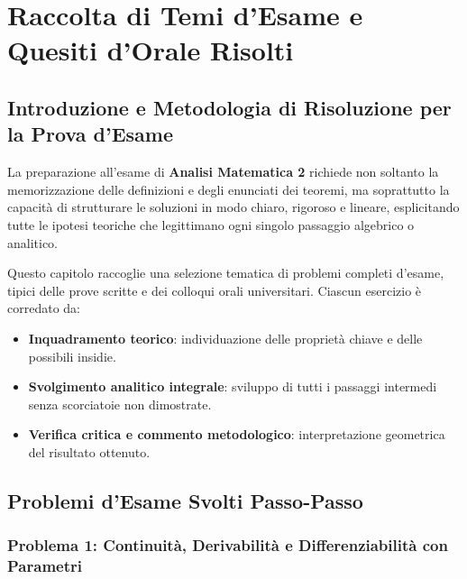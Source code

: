 
\chapter{Raccolta di Temi d'Esame e Quesiti d'Orale Risolti}
\label{chap:raccolta_esami_risolti}

\section{Introduzione e Metodologia di Risoluzione per la Prova d'Esame}

La preparazione all'esame di \textbf{Analisi Matematica 2} richiede non soltanto la memorizzazione delle definizioni e degli enunciati dei teoremi, ma soprattutto la capacità di strutturare le soluzioni in modo chiaro, rigoroso e lineare, esplicitando tutte le ipotesi teoriche che legittimano ogni singolo passaggio algebrico o analitico.

Questo capitolo raccoglie una selezione tematica di problemi completi d'esame, tipici delle prove scritte e dei colloqui orali universitari. Ciascun esercizio è corredato da:
\begin{itemize}
    \item \textbf{Inquadramento teorico}: individuazione delle proprietà chiave e delle possibili insidie.
    \item \textbf{Svolgimento analitico integrale}: sviluppo di tutti i passaggi intermedi senza scorciatoie non dimostrate.
    \item \textbf{Verifica critica e commento metodologico}: interpretazione geometrica del risultato ottenuto.
\end{itemize}

\section{Problemi d'Esame Svolti Passo-Passo}

\subsection{Problema 1: Continuità, Derivabilità e Differenziabilità con Parametri}

